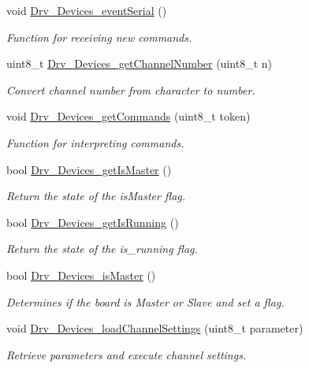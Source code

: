 \begin{DoxyCompactItemize}
void \hyperlink{group__Devices__Library_ga8092c357f91843e6fa9db02735addc7d}{Drv\+\_\+\+Devices\+\_\+event\+Serial} ()
\begin{DoxyCompactList}\small\item\em Function for receiving new commands. \end{DoxyCompactList}\item 
uint8\+\_\+t \hyperlink{group__Devices__Library_ga648ce331709a942df57efd5b8645db13}{Drv\+\_\+\+Devices\+\_\+get\+Channel\+Number} (uint8\+\_\+t n)
\begin{DoxyCompactList}\small\item\em Convert channel number from character to number. \end{DoxyCompactList}\item 
void \hyperlink{group__Devices__Library_gafb56f6b90c50e36cd6e34665d85fb903}{Drv\+\_\+\+Devices\+\_\+get\+Commands} (uint8\+\_\+t token)
\begin{DoxyCompactList}\small\item\em Function for interpreting commands. \end{DoxyCompactList}\item 
bool \hyperlink{group__Devices__Library_gaeab801d2d0a8823545cfde29704edc96}{Drv\+\_\+\+Devices\+\_\+get\+Is\+Master} ()
\begin{DoxyCompactList}\small\item\em Return the state of the is\+Master flag. \end{DoxyCompactList}\item 
bool \hyperlink{group__Devices__Library_ga65091ea2e7c2a0500683edf1bbc844ad}{Drv\+\_\+\+Devices\+\_\+get\+Is\+Running} ()
\begin{DoxyCompactList}\small\item\em Return the state of the is\+\_\+running flag. \end{DoxyCompactList}\item 
bool \hyperlink{group__Devices__Library_ga92e403bbfcda965385b78ce10bbea47a}{Drv\+\_\+\+Devices\+\_\+is\+Master} ()
\begin{DoxyCompactList}\small\item\em Determines if the board is Master or Slave and set a flag. \end{DoxyCompactList}\item 
void \hyperlink{group__Devices__Library_ga1b75ac5dd3eb55ef54cff5de501875a9}{Drv\+\_\+\+Devices\+\_\+load\+Channel\+Settings} (uint8\+\_\+t parameter)
\begin{DoxyCompactList}\small\item\em Retrieve parameters and execute channel settings. \end{DoxyCompactList}\item 

\end{DoxyCompactItemize}
